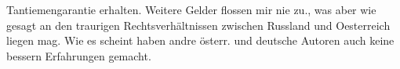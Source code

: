                Tantiemengarantie erhalten. Weitere Gelder flossen mir nie zu., was aber wie gesagt
               an den traurigen Rechtsverhältnissen zwischen Russland und Oesterreich liegen mag.
               Wie es scheint haben andre österr. und deutsche Autoren auch keine bessern Erfahrungen
               gemacht.\pend
           \endnumbering{}  \newcommand{\dateiname}{L02597}\newcommand{\titel}{Arthur Schnitzler an Marie Herzfeld, 20. 4. 1909}\newcommand{\editorInnen}{Martin Anton Müller und Laura Untner}
